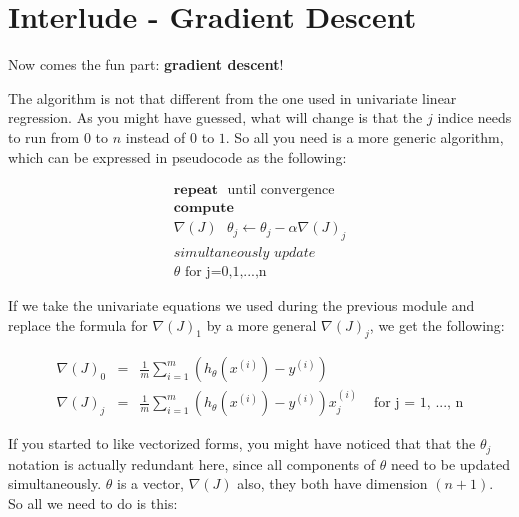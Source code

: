 
\section*{Interlude - Gradient Descent}

Now comes the fun part: \textbf{gradient descent}!

The algorithm is not that different from the one used in univariate 
linear regression. As you might have guessed, what will change is 
that the $j$ indice needs to run from $0$ to $n$ instead of $0$ 
to $1$. So all you need is a more generic algorithm, which can be 
expressed in pseudocode as the following:

$$ 
\begin{matrix}
\textbf{repeat} \text{ } \text{until convergence} \\
\textbf{compute} \\
\nabla{(J)} \text{ } \theta_j \gets \theta_j - \alpha \nabla(J)_j \\
\textit{simultaneously update} \\
\theta \text{ for j=0,1,...,n}
\end{matrix}
$$




If we take the univariate equations we used during the previous module and replace the formula for $\nabla(J)_1$ by a more general $\nabla(J)_j$, we get the following:

$$
\begin{matrix}
\nabla(J)_0 &  = &\frac{1}{m}\sum_{i=1}^{m}(h_{\theta}(x^{(i)}) - y^{(i)}) & \\
\nabla(J)_j & = &\frac{1}{m}\sum_{i=1}^{m}(h_{\theta}(x^{(i)}) - y^{(i)})x_{j}^{(i)} & \text{ for j = 1, ..., n}    
\end{matrix}
$$

If you started to like vectorized forms, you might have noticed that that the $\theta_j$ notation is actually redundant here, since all components of $\theta$ need to be updated simultaneously. $\theta$ is a vector, $\nabla{(J)}$ also, they both have dimension $(n+1)$. So all we need to do is this:


